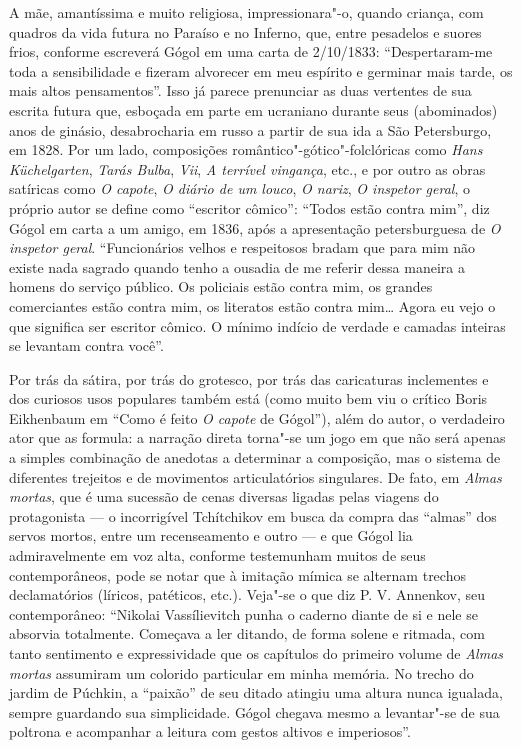 A mãe, amantíssima e muito religiosa, impressionara"-o, quando criança,
com quadros da vida futura no Paraíso e no Inferno, que, entre pesadelos
e suores frios, conforme escreverá Gógol em uma carta de 2/10/1833: ``Despertaram-me toda a sensibilidade e fizeram alvorecer em meu espírito e
germinar mais tarde, os mais altos pensamentos''. Isso já parece
prenunciar as duas vertentes de sua escrita futura que, esboçada em
parte em ucraniano durante seus (abominados) anos de ginásio,
desabrocharia em russo a partir de sua ida a São Petersburgo, em 1828.
Por um lado, composições romântico"-gótico"-folclóricas como \emph{Hans
Küchelgarten}, \emph{Tarás Bulba}, \emph{Vii}, \emph{A terrível vingança}, etc., e por outro
as obras satíricas como \emph{O capote}, \emph{O diário de um louco}, \emph{O nariz}, \emph{O
inspetor geral}, o próprio autor se
define como ``escritor cômico'': ``Todos estão contra mim'', diz Gógol em
carta a um amigo, em 1836, após a apresentação petersburguesa de \emph{O
inspetor geral}. ``Funcionários velhos e respeitosos bradam que para mim
não existe nada sagrado quando tenho a ousadia de me referir dessa
maneira a homens do serviço público. Os policiais estão contra mim, os
grandes comerciantes estão contra mim, os literatos estão contra mim\ldots{}
Agora eu vejo o que significa ser escritor cômico. O mínimo indício de
verdade e camadas inteiras se levantam contra você''.

Por trás da sátira, por trás do grotesco, por trás das caricaturas
inclementes e dos curiosos usos populares também está (como muito bem
viu o crítico Boris Eikhenbaum em ``Como é feito \emph{O capote} de Gógol''),
além do autor, o verdadeiro ator que as formula: a narração direta
torna"-se um jogo em que não será apenas a simples combinação de anedotas
a determinar a composição, mas o sistema de diferentes trejeitos e de
movimentos articulatórios singulares. De fato, em \emph{Almas mortas}, que é
uma sucessão de cenas diversas ligadas pelas viagens do protagonista --- o
incorrigível Tchítchikov em busca da compra das ``almas'' dos servos
mortos, entre um recenseamento e outro --- e que Gógol lia admiravelmente
em voz alta, conforme testemunham muitos de seus contemporâneos, pode se
notar que à imitação mímica se alternam trechos declamatórios (líricos,
patéticos, etc.). Veja"-se o que diz P. V. Annenkov, seu contemporâneo:
``Nikolai Vassílievitch punha o caderno diante de si e nele se absorvia
totalmente. Começava a ler ditando, de forma solene e ritmada, com tanto
sentimento e expressividade que os capítulos do primeiro volume de \emph{Almas
mortas} assumiram um colorido particular em minha memória. No trecho do jardim de Púchkin, a ``paixão'' de seu ditado atingiu uma
altura nunca igualada, sempre guardando sua simplicidade. Gógol chegava
mesmo a levantar"-se de sua poltrona e acompanhar a leitura com gestos
altivos e imperiosos''. 

